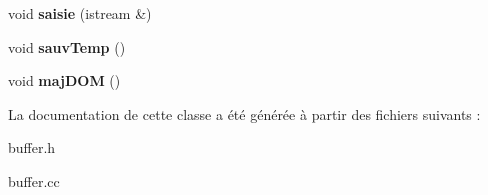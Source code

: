 \begin{DoxyCompactItemize}
\item 
\hypertarget{classBuffer_a9dddb1a46c258c5db1ed04a101e0a5cd}{void {\bfseries saisie} (istream \&)}\label{classBuffer_a9dddb1a46c258c5db1ed04a101e0a5cd}

\item 
\hypertarget{classBuffer_aa9f3fc3d9114811eba3029072eaf10fa}{void {\bfseries sauv\-Temp} ()}\label{classBuffer_aa9f3fc3d9114811eba3029072eaf10fa}

\item 
\hypertarget{classBuffer_aeddaa4c55df7da9daa8541157fc4f096}{void {\bfseries maj\-D\-O\-M} ()}\label{classBuffer_aeddaa4c55df7da9daa8541157fc4f096}

\end{DoxyCompactItemize}


\-La documentation de cette classe a été générée à partir des fichiers suivants \-:\begin{DoxyCompactItemize}
\item 
buffer.\-h\item 
buffer.\-cc\end{DoxyCompactItemize}

